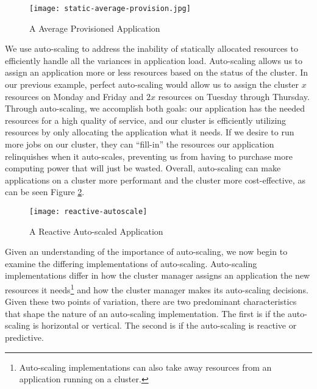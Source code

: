 \begin{figure}[!h]
  \centerline{\texttt{[image: static-average-provision.jpg]}}
  \caption{A Average Provisioned Application}
  \label{fig:static-average-provision}
\end{figure}

We use auto-scaling to address the inability of statically allocated
resources to efficiently handle all the variances in application load.
Auto-scaling allows us to assign an application more or less resources based on
the status of the cluster. In our previous example, perfect auto-scaling
would allow us to assign the cluster $x$ resources on Monday and Friday and
$2x$ resources on Tuesday through Thursday. Through auto-scaling, we accomplish
both goals: our application has the needed resources for a high quality
of service, and our cluster is efficiently utilizing resources by only
allocating the application what it needs. If we desire to run more jobs on our
cluster, they can ``fill-in'' the resources our application relinquishes when it
auto-scales, preventing us from having to purchase more computing power that
will just be wasted.
Overall, auto-scaling can make applications on a cluster more performant and
the cluster more cost-effective, as can be seen Figure
\ref{fig:reactive-autoscale}.

\begin{figure}[!h]
  \centerline{\texttt{[image: reactive-autoscale]}}
  \caption{A Reactive Auto-scaled Application}
  \label{fig:reactive-autoscale}
\end{figure}

Given an understanding of the importance of auto-scaling, we now begin to
examine the differing implementations of auto-scaling. Auto-scaling
implementations differ in how the cluster manager
assigns an application the new resources it
needs\footnote{Auto-scaling implementations can also take away resources from
an application running on a cluster.} and how the cluster manager makes its
auto-scaling decisions. Given these two points of
variation, there are two predominant characteristics that shape the nature of an auto-scaling
implementation. The first is if the auto-scaling is horizontal or vertical. The
second is if the auto-scaling is reactive or predictive.

